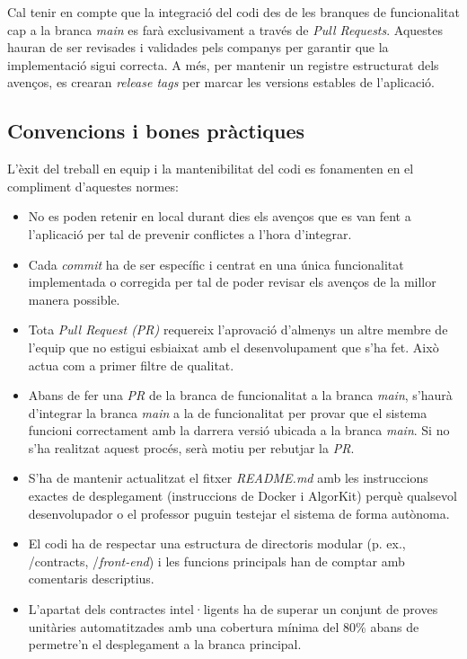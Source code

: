 Cal tenir en compte que la integració del codi des de les branques de funcionalitat cap a la branca \textit{main} es farà exclusivament a través de \textit{Pull Requests}. Aquestes hauran de ser revisades i validades pels companys per garantir que la implementació sigui correcta. A més, per mantenir un registre estructurat dels avenços, es crearan \textit{release tags} per marcar les versions estables de l'aplicació.

\subsection{Convencions i bones pràctiques}

L'èxit del treball en equip i la mantenibilitat del codi es fonamenten en el compliment d'aquestes normes:

\begin{itemize}
    \item No es poden retenir en local durant dies els avenços que es van fent a l'aplicació per tal de prevenir conflictes a l'hora d'integrar.
    \item Cada \textit{commit} ha de ser específic i centrat en una única funcionalitat implementada o corregida per tal de poder revisar els avenços de la millor manera possible.
    \item Tota \textit{Pull Request (PR)} requereix l'aprovació d'almenys un altre membre de l'equip que no estigui esbiaixat amb el desenvolupament que s'ha fet. Això actua com a primer filtre de qualitat.
    \item Abans de fer una \textit{PR} de la branca de funcionalitat a la branca \textit{main}, s'haurà d'integrar la branca \textit{main} a la de funcionalitat per provar que el sistema funcioni correctament amb la darrera versió ubicada a la branca \textit{main}. Si no s'ha realitzat aquest procés, serà motiu per rebutjar la \textit{PR}.
    \item S'ha de mantenir actualitzat el fitxer \textit{README.md} amb les instruccions exactes de desplegament (instruccions de Docker i AlgorKit) perquè qualsevol desenvolupador o el professor puguin testejar el sistema de forma autònoma.
    \item El codi ha de respectar una estructura de directoris modular (p. ex., /contracts, /\textit{front-end}) i les funcions principals han de comptar amb comentaris descriptius.
    \item L'apartat dels contractes intel·ligents ha de superar un conjunt de proves unitàries automatitzades amb una cobertura mínima del 80\% abans de permetre'n el desplegament a la branca principal.
\end{itemize}